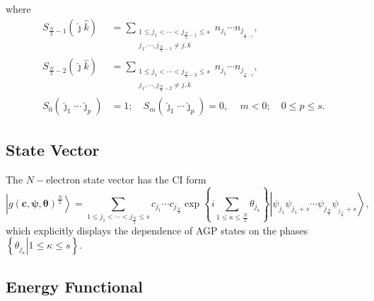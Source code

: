 \documentclass[aps,preprint]{revtex4}%
\begin{document}
where
\begin{align}
S_{\frac{N}{2}-1}\left(  \hat{\jmath}\hat{k}\right)   &  =\sum
_{\substack{1\leq j_{1}<\cdots<j_{\frac{N}{2}-1}\leq s\\j_{1},\cdots
,j_{\frac{N}{2}-1}\neq j,k}}n_{j_{1}}\cdots n_{j_{_{\frac{N}{2}-1}}},\\
S_{\frac{N}{2}-2}\left(  \hat{\jmath}\hat{k}\right)   &  =\sum
_{\substack{1\leq j_{1}<\cdots<j_{\frac{N}{2}-2}\leq s\\j_{1},\cdots
,j_{\frac{N}{2}-2}\neq j,k}}n_{j_{1}}\cdots n_{j_{_{\frac{N}{2}-2}}},\\
S_{0}\left(  \hat{\jmath}_{1}\cdots\hat{\jmath}_{p}\right)   &  =1;\quad
S_{m}\left(  \hat{\jmath}_{1}\cdots\hat{\jmath}_{p}\right)  =0,\,\quad
m<0;\quad0\leq p\leq s.
\end{align}


\subsection{State Vector\label{StateVec}}

The $N-$electron state vector has the CI form
\begin{equation}
\left\vert g\left(  \boldsymbol{c,\psi,\theta}\right)  ^{\frac{N}{2}%
}\right\rangle =\sum_{1\leq j_{1}<\cdots<j_{\frac{N}{2}}\leq s}c_{j_{1}}\cdots
c_{j_{\frac{N}{2}}}\exp\left\{  i\sum\limits_{1\leq\kappa\leq\frac{N}{2}%
}\theta_{j_{\kappa}}\right\}  \left\vert \psi_{j_{1}}\psi_{j_{1}+s}\cdots
\psi_{j_{\frac{N}{2}}}\psi_{_{j_{\frac{N}{2}}}+s}\right\rangle ,
\end{equation}
which explicitly displays the dependence of AGP states on the phases $\left\{
\left.  \theta_{j_{\kappa}}\right\vert 1\leq\kappa\leq s\right\}  $.

\subsection{Energy Functional\label{AGPFunc}}
\end{document}
